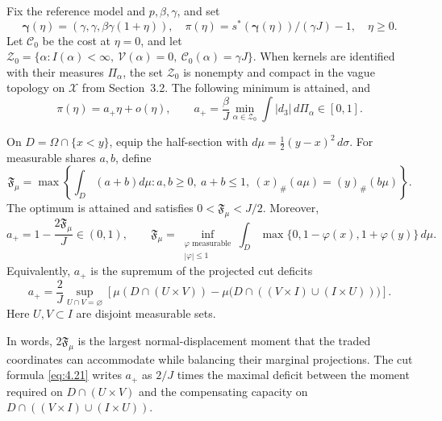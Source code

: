 \begin{theorem}\label{thm:projected-flow}
Fix the reference model and \(p,\beta,\gamma\), and set
\[
\boldsymbol\gamma(\eta)=(\gamma,\gamma,\beta\gamma(1+\eta)),\quad
\pi(\eta)=s^*(\boldsymbol\gamma(\eta))/(\gamma J)-1,\quad \eta\ge0.
\]
Let \(\mathcal C_0\) be the cost at \(\eta=0\), and let \(\mathcal Z_0=\{\alpha:I(\alpha)<\infty,\ \mathcal V(\alpha)=0,\ \mathcal C_0(\alpha)=\gamma J\}\). When kernels are identified with their measures \(\Pi_\alpha\), the set \(\mathcal Z_0\) is nonempty and compact in the vague topology on \(\mathscr X\) from Section~3.2. The following minimum is attained, and
\begin{equation}
\pi(\eta)=a_+\eta+o(\eta),\qquad
a_+=\frac\beta J\min_{\alpha\in\mathcal Z_0}
\int|d_3|\,d\Pi_\alpha\in[0,1].
\tag{4.19}\label{eq:4.19}
\end{equation}

On \(D=\Omega\cap\{x<y\}\), equip the half-section with \(d\mu=\frac12(y-x)^2\,d\sigma\). For measurable shares \(a,b\), define
\begin{equation*}
\mathfrak F_\mu=\max\left\{\int_D(a+b)d\mu:
a,b\ge0,\ a+b\le1,\ (x)_\#(a\mu)=(y)_\#(b\mu)\right\}.
\end{equation*}
The optimum is attained and satisfies \(0<\mathfrak F_\mu<J/2\). Moreover,
\begin{equation}
a_+=1-\frac{2\mathfrak F_\mu}{J}\in(0,1),\qquad
\mathfrak F_\mu=\inf_{\substack{\varphi\text{ measurable}\\|\varphi|\le1}}
\int_D\max\{0,1-\varphi(x),1+\varphi(y)\}\,d\mu.\tag{4.20}\label{eq:4.20}
\end{equation}
Equivalently, \(a_+\) is the supremum of the projected cut deficits
\begin{equation}
a_+=\frac2J\sup_{U\cap V=\varnothing}
\left[\mu(D\cap(U\times V))-
\mu\bigl(D\cap((V\times I)\cup(I\times U))\bigr)\right].\tag{4.21}\label{eq:4.21}
\end{equation}
Here \(U,V\subset I\) are disjoint measurable sets.

\end{theorem}

In words, \(2\mathfrak F_\mu\) is the largest normal-displacement moment that the traded coordinates can accommodate while balancing their marginal projections. The cut formula \eqref{eq:4.21} writes \(a_+\) as \(2/J\) times the maximal deficit between the moment required on \(D\cap(U\times V)\) and the compensating capacity on \(D\cap((V\times I)\cup(I\times U))\).

